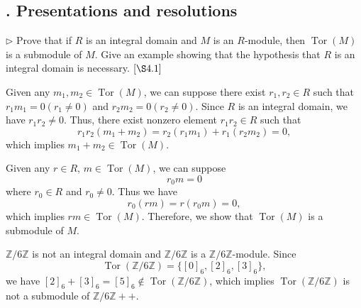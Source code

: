 \documentclass[12pt,letterpaper,boxed]{hmcpset}
\begin{document}
\subsection{. Presentations and resolutions}
\begin{problem}[4.1]
$\triangleright$ Prove that if $R$ is an integral domain and $M$ is an $R$-module, then $\operatorname{Tor}(M)$ is a submodule of $M$. Give an example showing that the hypothesis that $R$ is an integral domain is necessary. $[\S 4.1]$
\end{problem}
\begin{solution}
Given any $m_1,m_2\in\operatorname{Tor}(M)$, we can suppose there exist $r_1,r_2\in R$ such that $r_1m_1=0(r_1\ne0)$ and $r_2m_2=0(r_2\ne0)$. Since $R$ is an integral domain, we have $r_1r_2\ne0$. Thus, there exist nonzero element $r_1r_2\in R$ such that 
$$
r_1r_2(m_1+m_2)=r_2(r_1m_1)+r_1(r_2m_2)=0,
$$
which implies $m_1+m_2\in\operatorname{Tor}(M)$.

Given any $r\in R$, $m\in\operatorname{Tor}(M)$, we can suppose
\[
r_0m=0
\]
where $r_0\in R$ and $r_0\ne0$. Thus we have
\[
r_0(rm)=r(r_0m)=0,
\]
which implies $rm\in\operatorname{Tor}(M)$. Therefore, we show that $\operatorname{Tor}(M)$ is a submodule of $M$.

$\mathbb{Z}/6\mathbb{Z}$ is not an integral domain and $\mathbb{Z}/6\mathbb{Z}$ is a $\mathbb{Z}/6\mathbb{Z}$-module. Since
\[
\operatorname{Tor}(\mathbb{Z}/6\mathbb{Z})=\{[0]_6,[2]_6,[3]_6\},
\]
we have $[2]_6+[3]_6=[5]_6\notin \operatorname{Tor}(\mathbb{Z}/6\mathbb{Z})$, which implies $\operatorname{Tor}(\mathbb{Z}/6\mathbb{Z})$ is not a submodule of $\mathbb{Z}/6\mathbb{Z}
++$.
\end{solution}
\end{document}
